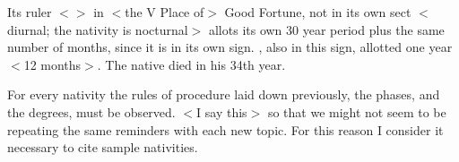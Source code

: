 Its ruler $<$\Saturn$>$ in $<$the V Place of$>$ Good Fortune, not in its own sect $<$diurnal; the nativity is nocturnal$>$
allots its own 30 year period plus the same number of months, since it is in its own sign. \Jupiter, also in this sign, allotted one year $<$12 months$>$. The native died in his 34th year.

For every nativity the rules of procedure laid down previously, the phases, and the degrees, must be observed. $<$I say this$>$ so that we might not seem to be repeating the same reminders with each new topic. For this reason I consider it necessary to cite sample nativities.


\newpage